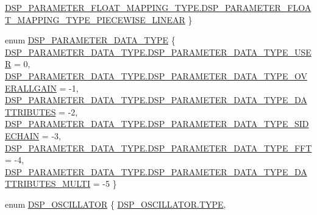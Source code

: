 \begin{DoxyCompactItemize}
\hyperlink{namespace_f_m_o_d_afd26b4f5904412578911d16a5d3d904fa02a38d69822e0249e0c79e86975f6363}{D\+S\+P\+\_\+\+P\+A\+R\+A\+M\+E\+T\+E\+R\+\_\+\+F\+L\+O\+A\+T\+\_\+\+M\+A\+P\+P\+I\+N\+G\+\_\+\+T\+Y\+P\+E.\+D\+S\+P\+\_\+\+P\+A\+R\+A\+M\+E\+T\+E\+R\+\_\+\+F\+L\+O\+A\+T\+\_\+\+M\+A\+P\+P\+I\+N\+G\+\_\+\+T\+Y\+P\+E\+\_\+\+P\+I\+E\+C\+E\+W\+I\+S\+E\+\_\+\+L\+I\+N\+E\+AR}
 \}
\item 
enum \hyperlink{namespace_f_m_o_d_a9b16cc3bd4a16a6ee30b573c2b765630}{D\+S\+P\+\_\+\+P\+A\+R\+A\+M\+E\+T\+E\+R\+\_\+\+D\+A\+T\+A\+\_\+\+T\+Y\+PE} \{ \newline
\hyperlink{namespace_f_m_o_d_a9b16cc3bd4a16a6ee30b573c2b765630aadc5650e1f8b156bf7285cee60eb9cf7}{D\+S\+P\+\_\+\+P\+A\+R\+A\+M\+E\+T\+E\+R\+\_\+\+D\+A\+T\+A\+\_\+\+T\+Y\+P\+E.\+D\+S\+P\+\_\+\+P\+A\+R\+A\+M\+E\+T\+E\+R\+\_\+\+D\+A\+T\+A\+\_\+\+T\+Y\+P\+E\+\_\+\+U\+S\+ER} = 0, 
\hyperlink{namespace_f_m_o_d_a9b16cc3bd4a16a6ee30b573c2b765630a4d2f87150cd5ec2e548836d8efe44554}{D\+S\+P\+\_\+\+P\+A\+R\+A\+M\+E\+T\+E\+R\+\_\+\+D\+A\+T\+A\+\_\+\+T\+Y\+P\+E.\+D\+S\+P\+\_\+\+P\+A\+R\+A\+M\+E\+T\+E\+R\+\_\+\+D\+A\+T\+A\+\_\+\+T\+Y\+P\+E\+\_\+\+O\+V\+E\+R\+A\+L\+L\+G\+A\+IN} = -\/1, 
\hyperlink{namespace_f_m_o_d_a9b16cc3bd4a16a6ee30b573c2b765630a8b1fdf7fab3e252e4544d91c4a935cdd}{D\+S\+P\+\_\+\+P\+A\+R\+A\+M\+E\+T\+E\+R\+\_\+\+D\+A\+T\+A\+\_\+\+T\+Y\+P\+E.\+D\+S\+P\+\_\+\+P\+A\+R\+A\+M\+E\+T\+E\+R\+\_\+\+D\+A\+T\+A\+\_\+\+T\+Y\+P\+E\+\_\+D\+A\+T\+T\+R\+I\+B\+U\+T\+ES} = -\/2, 
\hyperlink{namespace_f_m_o_d_a9b16cc3bd4a16a6ee30b573c2b765630a315e88b2a564ae4ecc4e3cf2cc5014fd}{D\+S\+P\+\_\+\+P\+A\+R\+A\+M\+E\+T\+E\+R\+\_\+\+D\+A\+T\+A\+\_\+\+T\+Y\+P\+E.\+D\+S\+P\+\_\+\+P\+A\+R\+A\+M\+E\+T\+E\+R\+\_\+\+D\+A\+T\+A\+\_\+\+T\+Y\+P\+E\+\_\+\+S\+I\+D\+E\+C\+H\+A\+IN} = -\/3, 
\newline
\hyperlink{namespace_f_m_o_d_a9b16cc3bd4a16a6ee30b573c2b765630af07637b42c17dcf8782a163c4475e4da}{D\+S\+P\+\_\+\+P\+A\+R\+A\+M\+E\+T\+E\+R\+\_\+\+D\+A\+T\+A\+\_\+\+T\+Y\+P\+E.\+D\+S\+P\+\_\+\+P\+A\+R\+A\+M\+E\+T\+E\+R\+\_\+\+D\+A\+T\+A\+\_\+\+T\+Y\+P\+E\+\_\+\+F\+FT} = -\/4, 
\hyperlink{namespace_f_m_o_d_a9b16cc3bd4a16a6ee30b573c2b765630adbcc45659c5651c400f92a3e740fc3c9}{D\+S\+P\+\_\+\+P\+A\+R\+A\+M\+E\+T\+E\+R\+\_\+\+D\+A\+T\+A\+\_\+\+T\+Y\+P\+E.\+D\+S\+P\+\_\+\+P\+A\+R\+A\+M\+E\+T\+E\+R\+\_\+\+D\+A\+T\+A\+\_\+\+T\+Y\+P\+E\+\_\+D\+A\+T\+T\+R\+I\+B\+U\+T\+E\+S\+\_\+\+M\+U\+L\+TI} = -\/5
 \}
\item 
enum \hyperlink{namespace_f_m_o_d_a3e74e763d9647e8780bf2630d035b8da}{D\+S\+P\+\_\+\+O\+S\+C\+I\+L\+L\+A\+T\+OR} \{ \hyperlink{namespace_f_m_o_d_a3e74e763d9647e8780bf2630d035b8daa948495146facadfe8859789036313d79}{D\+S\+P\+\_\+\+O\+S\+C\+I\+L\+L\+A\+T\+O\+R.\+T\+Y\+PE}, 

\end{DoxyCompactItemize}
